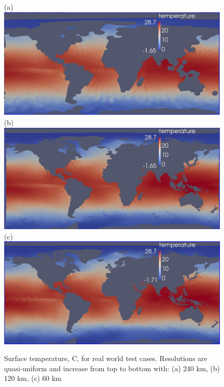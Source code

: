 \begin{figure}[H]
	\centering
(a)\includegraphics[scale=0.36]{ocean/figures/m72m_240km_yr11_k1_T.jpg}\\
(b)\includegraphics[scale=0.36]{ocean/figures/m72g_120km_yr11_k1_T.jpg}\\
(c)\includegraphics[scale=0.36]{ocean/figures/m72h_60km_yr11_k1_T.jpg}
\caption{Surface temperature, C, for real world test cases.  Resolutions are quasi-uniform and increase from top to bottom with: (a) 240 km, (b) 120 km, (c) 60 km} 
	\label{fig:real_world_T1}
\end{figure}

